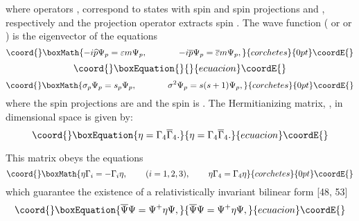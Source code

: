 \documentclass[a4paper,12pt]{article}
\begin{document}
where operators \coordHE{}, \coordHE{}
correspond to states with spin \coordHE{} and spin projections \coordHE{}
and \coordHE{}, respectively and the projection operator \coordHE{} extracts spin \coordHE{}.
The wave function \coordHE{} (\coordHE{} or \myHighlight{$\Psi _{\varepsilon
,\overline{\varepsilon }}$}\coordHE{} or \coordHE{}) is the eigenvector of the
equations
\[\coord{}\boxMath{
-i\widehat{p}\Psi _p=\varepsilon m\Psi _p ,
\hspace{0.5in}-i\overline{p}\Psi _p= \overline{\varepsilon }m\Psi
_p ,
}{corchetes}{0pt}\coordE{}\]
\vspace{-8mm}
\begin{equation}\coord{}\boxEquation{  \label{34}
}{  }{ecuacion}\coordE{}\end{equation}
\vspace{-8mm}
\[\coord{}\boxMath{
\sigma _p\Psi _p=s_p\Psi _p ,\hspace{0.5in}\sigma ^2\Psi
_p=s(s+1)\Psi _p ,
}{corchetes}{0pt}\coordE{}\]
where the spin projections are \coordHE{} and the spin is \coordHE{}. The
Hermitianizing matrix, \myHighlight{$\eta $}\coordHE{}, in \coordHE{}dimensional space is given by:
\begin{equation}\coord{}\boxEquation{
\eta =\Gamma _4\overline{\Gamma }_4 . \label{35}
}{
\eta =\Gamma _4\overline{\Gamma }_4 . }{ecuacion}\coordE{}\end{equation}

This matrix obeys the equations
\[\coord{}\boxMath{
\eta \Gamma _i=-\Gamma _i\eta ,\hspace{0.3in}(i=1,2,3) ,
\hspace{0.3in}\eta \Gamma _4=\Gamma _4\eta
}{corchetes}{0pt}\coordE{}\]
which guarantee the existence of a relativistically invariant
bilinear form [48, 53]
\begin{equation}\coord{}\boxEquation{
\overline{\Psi }\Psi =\Psi ^{+}\eta \Psi , \label{36}
}{
\overline{\Psi }\Psi =\Psi ^{+}\eta \Psi , }{ecuacion}\coordE{}\end{equation}
\end{document}
